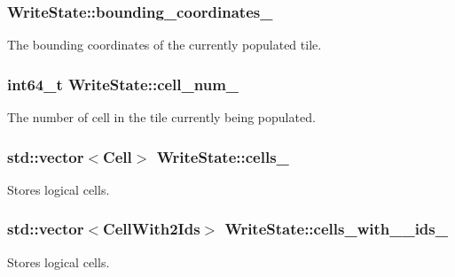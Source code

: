 \subsubsection[{bounding\+\_\+coordinates\+\_\+}]{ Write\+State\+::bounding\+\_\+coordinates\+\_\+\hspace{0.3cm}{\ttfamily [private]}}\label{classWriteState_a50b41a53268ae74bec6e24695624f9d0}
The bounding coordinates of the currently populated tile. \hypertarget{classWriteState_a059d757cb8fbc5bb7bfff6e1f5ea7f79}{}
\subsubsection[{cell\+\_\+num\+\_\+}]{\setlength{\rightskip}{0pt plus 5cm}int64\+\_\+t Write\+State\+::cell\+\_\+num\+\_\+\hspace{0.3cm}{\ttfamily [private]}}\label{classWriteState_a059d757cb8fbc5bb7bfff6e1f5ea7f79}
The number of cell in the tile currently being populated. \hypertarget{classWriteState_a90d90b4abfd9e35f1726842617122558}{}
\subsubsection[{cells\+\_\+}]{\setlength{\rightskip}{0pt plus 5cm}std\+::vector$<${\bf Cell}$>$ Write\+State\+::cells\+\_\+\hspace{0.3cm}{\ttfamily [private]}}\label{classWriteState_a90d90b4abfd9e35f1726842617122558}
Stores logical cells. \hypertarget{classWriteState_a1b14e06c30ce9617b2f1a16263b1a134}{}
\subsubsection[{cells\+\_\+with\+\_\+2\+\_\+ids\+\_\+}]{\setlength{\rightskip}{0pt plus 5cm}std\+::vector$<${\bf Cell\+With2\+Ids}$>$ Write\+State\+::cells\+\_\+with\+\_\+\_\+ids\+\_\+\hspace{0.3cm}{\ttfamily [private]}}\label{classWriteState_a1b14e06c30ce9617b2f1a16263b1a134}
Stores logical cells. \hypertarget{classWriteState_a296e22c27c0c1965771670d3bdd2dfd5}{}
